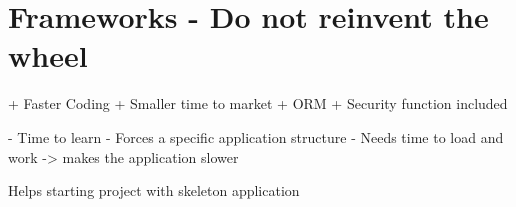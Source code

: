 \section{Frameworks - Do not reinvent the wheel}

+ Faster Coding
+ Smaller time to market
+ ORM
+ Security function included

- Time to learn
- Forces a specific application structure
- Needs time to load and work -> makes the application slower


Helps starting project with skeleton application

